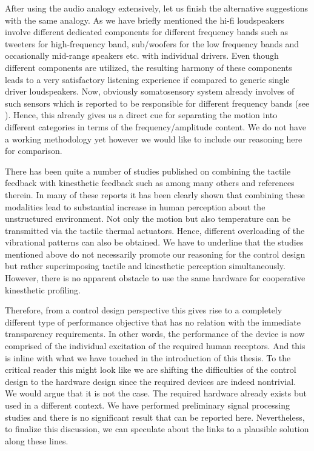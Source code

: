 After using the audio analogy extensively, let us finish the alternative suggestions with the same analogy. As we have briefly mentioned
the hi-fi loudspeakers involve different dedicated components for different frequency bands such as tweeters for high-frequency band,
sub/woofers for the low frequency bands and occasionally mid-range speakers etc. with individual drivers. Even though different components are 
utilized, the resulting harmony of these components leads to a very satisfactory listening experience if compared to generic single driver
loudspeakers. Now, obviously somatosensory system already involves of such sensors which is reported to be responsible for different 
frequency bands (see ). Hence, this already gives us a direct cue for separating the motion into different categories 
in terms of the frequency/amplitude content. We do not have a working methodology yet however we would like to include our reasoning here
for comparison. 



There has been quite a number of studies published on combining the tactile feedback with kinesthetic feedback such as \cite{kammermeier,
kimcolgate,kyung,pacchierotti,meli} among many others and references therein. In many of these reports it has been clearly shown that 
combining these modalities lead to substantial increase in human perception about the unstructured environment. Not only the motion but 
also temperature can be transmitted via the tactile thermal actuators. Hence, different overloading of the vibrational patterns can also 
be obtained. We have to underline that the studies mentioned above do not necessarily promote our reasoning for the control design but 
rather superimposing tactile and kinesthetic perception simultaneously. However, there is no apparent obstacle to use the same hardware 
for cooperative kinesthetic profiling. 



Therefore, from a control design perspective this gives rise to a completely different type of performance objective that has no relation 
with the immediate transparency requirements. In other words, the performance of the device is now comprised of the individual excitation 
of the required human receptors. And this is inline with what we have touched in the introduction of this thesis. To the critical reader
this might look like we are shifting the difficulties of the control design to the hardware design since the required devices are indeed
nontrivial. We would argue that it is not the case. The required hardware already exists but used in a different context. We have performed 
preliminary signal processing studies and there is no significant result that can be reported here. Nevertheless, to finalize this discussion,
we can speculate about the links to a plausible solution along these lines.



